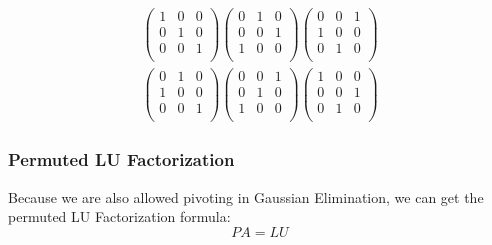         \begin{equation}\label{eq:perm_matrices}
            \begin{aligned}
                \begin{pmatrix}
                    1 & 0 & 0\\
                    0 & 1 & 0\\
                    0 & 0 & 1\\
                \end{pmatrix}
                \begin{pmatrix}
                    0 & 1 & 0\\
                    0 & 0 & 1\\
                    1 & 0 & 0\\
                \end{pmatrix}
                \begin{pmatrix}
                    0 & 0 & 1\\
                    1 & 0 & 0\\
                    0 & 1 & 0\\
                \end{pmatrix}\\
                \begin{pmatrix}
                    0 & 1 & 0\\
                    1 & 0 & 0\\
                    0 & 0 & 1\\
                \end{pmatrix}
                \begin{pmatrix}
                    0 & 0 & 1\\
                    0 & 1 & 0\\
                    1 & 0 & 0\\
                \end{pmatrix}
                \begin{pmatrix}
                    1 & 0 & 0\\
                    0 & 0 & 1\\
                    0 & 1 & 0\\
                \end{pmatrix}
            \end{aligned}
        \end{equation}

        \subsubsection{Permuted LU Factorization}
        Because we are also allowed pivoting in Gaussian Elimination, we can get the permuted LU Factorization formula:
        \[
            PA = LU
        \]

